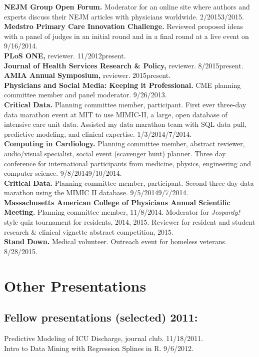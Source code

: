 \documentclass[12pt]{article}
\begin{document}
\textbf{NEJM Group Open Forum.} Moderator for an online site where
authors and experts discuss their NEJM articles with physicians
worldwide. 2/2015\ndash{}3/2015.\\
\textbf{Medstro Primary Care Innovation Challenge.}
Reviewed proposed ideas with a panel of judges in an initial round and
in a final round at a live event on 9/16/2014.\\
\textbf{PLoS ONE,} reviewer. 11/2012\ndash{}present.\\
\textbf{Journal of Health Services Research \& Policy,} reviewer.
8/2015\ndash{}present.\\
\textbf{AMIA Annual Symposium,} reviewer. 2015\ndash{}present.\\
\textbf{Physicians and Social Media: Keeping it Professional.} CME planning
committee member and panel moderator. 9/26/2013.\\
\textbf{Critical Data.} Planning committee member, participant. First
ever three-day data
marathon event at MIT to use MIMIC-II, a large, open database of
intensive care unit data. Assisted my data marathon team with SQL data
pull, predictive modeling, and clinical expertise. 1/3/2014\ndash{}/7/2014.\\
\textbf{Computing in Cardiology.} Planning committee member, abstract
reviewer, audio/visual specialist, social event (scavenger hunt)
planner. Three day conference for international participants from
medicine, physics, engineering and computer science.
9/8/2014\ndash{}9/10/2014.\\
\textbf{Critical Data.} Planning committee member, participant. Second
three-day data marathon using the MIMIC II database. 9/5/2014\ndash{}9/7/2014.\\
\textbf{Massachusetts American College of Physicians Annual Scientific
  Meeting.} Planning committee member, 11/8/2014. Moderator for
\emph{Jeopardy!}-style quiz tournament for residents, 2014, 2015.
Reviewer for resident and student research \& clinical vignette
abstract competition, 2015.\\
\textbf{Stand Down.} Medical volunteer. Outreach event for homeless
veterans. 8/28/2015.

\section*{Other Presentations}

\subsection*{Fellow presentations (selected) 2011:}
Predictive Modeling of ICU Discharge, journal club. 11/18/2011.\\
Intro to Data Mining with Regression Splines in R. 9/6/2012.
\end{document}
